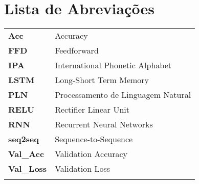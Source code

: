 \chapter{Lista de Abreviações}
\begin{tabular}{ll}
\vspace{3mm}
\textbf{Acc} 		 & Accuracy\\ \vspace{3mm}
\textbf{FFD} 		 & Feedforward\\ \vspace{3mm}
\textbf{IPA} 		 & International Phonetic Alphabet\\ \vspace{3mm}
\textbf{LSTM} 		 & Long-Short Term Memory\\ \vspace{3mm}
\textbf{PLN} 		 & Processamento de Linguagem Natural\\ \vspace{3mm}
\textbf{RELU} 		 & Rectifier Linear Unit\\ \vspace{3mm}
\textbf{RNN} 		 & Recurrent Neural Networks\\ \vspace{3mm}
\textbf{seq2seq} 	 & Sequence-to-Sequence\\ \vspace{3mm}
\textbf{Val\_Acc} 	 & Validation Accuracy\\ \vspace{3mm}
\textbf{Val\_Loss} 	 & Validation Loss\\ \vspace{3mm}

\end{tabular}
